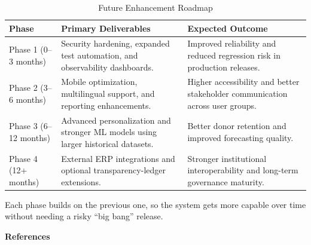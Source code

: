 \documentclass{thesis-library}
\begin{document}
\begin{table}[H]
    \centering
    \caption{Future Enhancement Roadmap}
    \vspace{10pt}
    \begin{tabularx}{\linewidth}{|P{3cm}|P{5.5cm}|L|}
        \hline
        \textbf{Phase} & \textbf{Primary Deliverables} & \textbf{Expected Outcome} \\
        \hline
        Phase 1 (0--3 months) & Security hardening, expanded test automation, and observability dashboards. & Improved reliability and reduced regression risk in production releases. \\
        \hline
        Phase 2 (3--6 months) & Mobile optimization, multilingual support, and reporting enhancements. & Higher accessibility and better stakeholder communication across user groups. \\
        \hline
        Phase 3 (6--12 months) & Advanced personalization and stronger ML models using larger historical datasets. & Better donor retention and improved forecasting quality. \\
        \hline
        Phase 4 (12+ months) & External ERP integrations and optional transparency-ledger extensions. & Stronger institutional interoperability and long-term governance maturity. \\
        \hline
    \end{tabularx}
\end{table}

Each phase builds on the previous one, so the system gets more capable over time without needing a risky ``big bang'' release.

\renewcommand{\bibname}{References}

\cleardoublepage
\thispagestyle{empty}

\vspace*{\fill}
\begin{center}
    \Huge \bfseries References
\end{center}
\vspace*{\fill}





\end{document}
